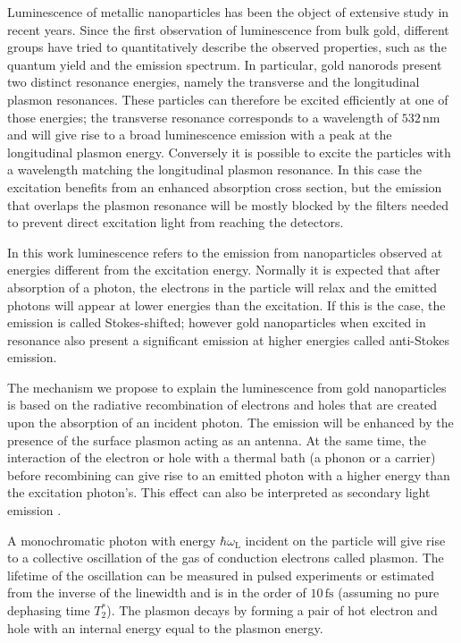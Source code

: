 \documentclass[journal=nalefd,manuscript=letter]{achemso}
\newcommand{\nm}{\ensuremath{\,\textrm{nm}}}
\newcommand{\fs}{\ensuremath{\,\textrm{fs}}}
\begin{document}
Luminescence of metallic nanoparticles has been the object of extensive study in
recent years. Since the first observation of luminescence from bulk
gold\cite{Mooradian1969}, different groups have tried to quantitatively describe
the observed properties\cite{Mohamed2000,Beversluis2003a}, such as the quantum
yield\cite{Fang2012,Rao2015,Yorulmaz2012,Cheng2015,Dulkeith2004} and the
emission spectrum\cite{Link2010}. In particular, gold nanorods present two distinct
resonance energies, namely the transverse and the longitudinal plasmon
resonances. These particles can therefore be excited efficiently at one of those
energies; the transverse resonance corresponds to a wavelength of $532\nm$ and will give
rise to a broad luminescence emission with a peak at the longitudinal plasmon energy.
Conversely it is possible to excite the particles with a wavelength matching
the longitudinal plasmon resonance. In this case the excitation benefits from
an enhanced absorption cross section, but the emission that overlaps the plasmon
resonance will be mostly blocked by the filters needed to prevent direct
excitation light from reaching the detectors.

In this work luminescence refers to the emission from nanoparticles observed at
energies different from the excitation energy. Normally it is expected that
after absorption of a photon, the electrons in the particle will relax and the
emitted photons will appear at lower energies than the excitation. If this is the
case, the emission is called Stokes-shifted; however gold nanoparticles when
excited in resonance also present a significant emission at higher energies
called anti-Stokes emission\cite{Jiang2013,He2015,Carattino2016a}.

The mechanism we propose to explain the luminescence from gold nanoparticles is
based on the radiative recombination of electrons and holes that are created
upon the absorption of an incident photon\cite{Dulkeith2004,Mooradian1969}. The
emission will be enhanced by the presence of the surface plasmon acting as an
antenna\cite{Mohamed2000}. At the same time, the interaction
of the electron or hole with a thermal bath (a phonon or a carrier) before
recombining can give rise to an emitted photon with a higher energy than the
excitation photon's\cite{Hodak2000,Giri2015,Arbouet2003a}. This effect can also
be interpreted as secondary light emission \cite{Huang2014}.

A monochromatic photon with energy $\hbar\omega_\textrm{L}$ incident on the
particle will give rise to a collective oscillation of the gas of conduction
electrons called plasmon. The lifetime of the oscillation can be measured in
pulsed experiments or estimated from the inverse of the linewidth and is in the
order of $10\fs$\cite{Sonnichsen2002} (assuming no pure dephasing time $T_2^*$).
The plasmon decays by forming a pair of hot electron and hole with an internal energy equal to the plasmon
energy\cite{Sundararaman2014,Brongersma2015,AlejandroManjavacasJunG.LiuVikramKulkarni2014}.
\end{document}
